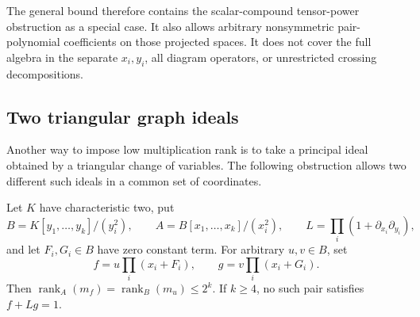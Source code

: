 The general bound therefore contains the scalar-compound
tensor-power obstruction as a special case. It also allows arbitrary
nonsymmetric pair-polynomial coefficients on those projected spaces.
It does not cover the full algebra in the separate \(x_i,y_i\),
all diagram operators, or unrestricted crossing decompositions.

\subsection{Two triangular graph ideals}

Another way to impose low multiplication rank is to take a principal
ideal obtained by a triangular change of variables. The following
obstruction allows two different such ideals in a common set of coordinates.

\begin{proposition}\label{prop:triangular-graph-ideals}
Let \(K\) have characteristic two, put
\[
 B=K[y_1,\ldots,y_k]/(y_i^2),\qquad
 A=B[x_1,\ldots,x_k]/(x_i^2),\qquad
 L=\prod_i(1+\partial_{x_i}\partial_{y_i}),
\]
and let \(F_i,G_i\in B\) have zero constant term. For arbitrary
\(u,v\in B\), set
\[
 f=u\prod_i(x_i+F_i),\qquad g=v\prod_i(x_i+G_i).
\]
Then \(\operatorname{rank}_A(m_f)=\operatorname{rank}_B(m_u)\leq2^k\).
If \(k\geq4\), no such pair satisfies \(f+Lg=1\).
\end{proposition}
